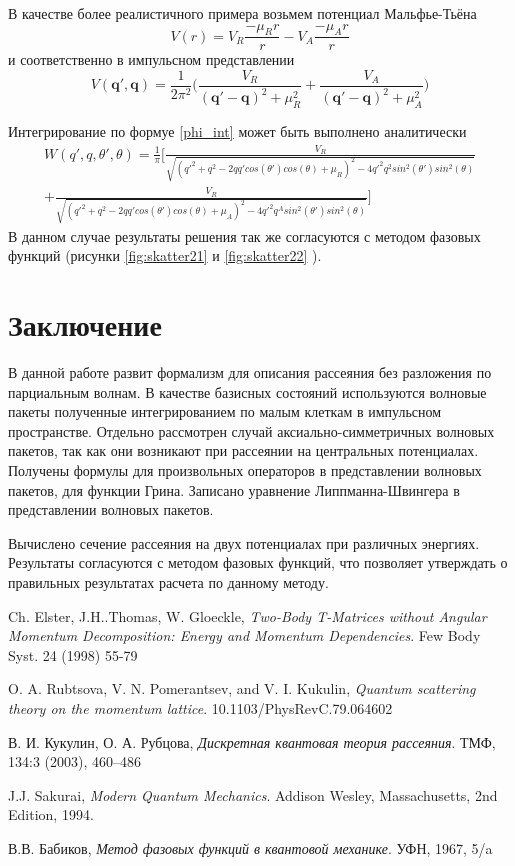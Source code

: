 \documentclass[a4paper,12pt]{article}
\newcommand{\vect}[1]{\boldsymbol{#1}}
\begin{document}
В качестве более реалистичного примера возьмем потенциал Мальфье-Тьёна
\[
V(r) = V_R\frac{-\mu_Rr}{r} - V_A\frac{-\mu_Ar}{r}
\]
и соответственно в импульсном представлении
\[
V(\vect{q'},\vect{q}) = \frac{1}{2\pi^2}\bigg( \frac{V_R}{(\vect{q'}-\vect{q})^2+\mu_R^2} + \frac{V_A}{(\vect{q'}-\vect{q})^2+\mu_A^2} \bigg)
\]

Интегрирование по формуе \ref{phi_int} может быть выполнено аналитически
\begin{multline}
W(q',q,\theta',\theta) = \frac{1}{\pi}\bigg[ \frac{V_R}{\sqrt{(q'^2+q^2-2qq'cos(\theta')cos(\theta)+\mu_R)^2 - 4q'^2q^2sin^2(\theta')sin^2(\theta) }} \\ +  \frac{V_R}{\sqrt{(q'^2+q^2-2qq'cos(\theta')cos(\theta)+\mu_A)^2 - 4q'^2q^Asin^2(\theta')sin^2(\theta) }} \bigg]
\end{multline}
В данном случае результаты решения так же согласуются с методом фазовых функций (рисунки \ref{fig:skatter21} и \ref{fig:skatter22} ).

\newline
\section{Заключение}

В данной работе развит формализм для описания рассеяния без разложения по парциальным волнам. В качестве базисных состояний используются волновые пакеты полученные интегрированием по малым клеткам в импульсном пространстве. Отдельно рассмотрен случай аксиально-симметричных волновых пакетов, так как они возникают при рассеянии на центральных потенциалах. Получены формулы для произвольных операторов в представлении волновых пакетов, для функции Грина. Записано уравнение Липпманна-Швингера в представлении волновых пакетов.

Вычислено сечение рассеяния на двух потенциалах при различных энергиях. Результаты согласуются с методом фазовых функций, что позволяет утверждать о правильных результатах расчета по данному методу.


\pagebreak
{} 
\begin{thebibliography}{9}

  Ch. Elster, J.H..Thomas, W. Gloeckle,
  \emph{Two-Body T-Matrices without Angular Momentum Decomposition: Energy and Momentum Dependencies}.
  Few Body Syst. 24 (1998) 55-79

  O. A. Rubtsova, V. N. Pomerantsev, and V. I. Kukulin,
  \emph{Quantum scattering theory on the momentum lattice}.
  10.1103/PhysRevC.79.064602

  В. И. Кукулин, О. А. Рубцова,
  \emph{Дискретная квантовая теория рассеяния}.
  ТМФ, 134:3 (2003), 460–486 

  J.J. Sakurai,
  \emph{Modern Quantum Mechanics}.
  Addison Wesley, Massachusetts,
  2nd Edition,
  1994.

  В.В. Бабиков,
  \emph{Метод фазовых функций в квантовой механике}.
  УФН, 1967, 5/a

\end{thebibliography}


    
\end{document}
